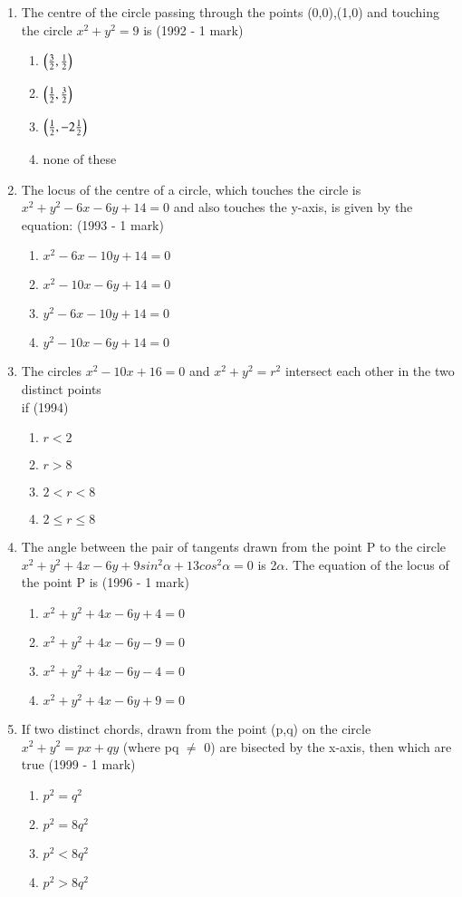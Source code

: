 \documentclass[journal,12pt,twocolumn]{IEEEtran}
\theoremstyle{remark}
\begin{document}
\begin{enumerate}[label=\arabic*.]
    \item The centre of the circle passing through the points (0,0),(1,0) and touching the circle $x^{2}+y^{2}=9$ is
    \hfill {(1992 - 1 mark)}
    \begin{enumerate}[label=(\alph*)]
    \item $\left(\frac{3}{2},\frac{1}{2}\right)$
    \item $\left(\frac{1}{2},\frac{3}{2}\right)$
    \item $\left(\frac{1}{2},-2\frac{1}{2}\right)$
    \item none of these
    \end{enumerate}
    \item The locus of the centre of a circle, which touches the circle is $x^{2}+y^{2}-6x-6y+14=0$ and also touches the y-axis, is given by the equation: \hfill {(1993 - 1 mark)}
    \begin{enumerate}[label=(\alph*)]
    \item $x^{2}-6x-10y+14=0$
    \item $x^{2}-10x-6y+14=0$
    \item $y^{2}-6x-10y+14=0$
    \item $y^{2}-10x-6y+14=0$
    \end{enumerate}
    \item The circles $x^{2}-10x+16=0$ and $x^{2}+y^{2}=r^{2}$ intersect each other in the two distinct points\\ if
    \hfill {(1994)}
    \begin{enumerate}[label=(\alph*)]
    \item $r<2$
    \item $r>8$
    \item $2<r<8$
    \item $2\leq r\leq8$
    \end{enumerate}
    \item The angle between the pair of tangents drawn from the point P to the circle $x^{2}+y^{2}+4x-6y+9sin^{2}\alpha+13cos^{2}\alpha=0$ is 2$\alpha$. The equation of the locus of the point P is
    \hfill {(1996 - 1 mark)}
    \begin{enumerate}[label=(\alph*)]
    \item $x^{2}+y^{2}+4x-6y+4=0$
    \item $x^{2}+y^{2}+4x-6y-9=0$
    \item $x^{2}+y^{2}+4x-6y-4=0$
    \item $x^{2}+y^{2}+4x-6y+9=0$
    \end{enumerate}
    \item If two distinct chords, drawn from the point (p,q) on the circle $x^{2}+y^{2}=px+qy$ (where pq $\neq$ 0) are bisected by the x-axis, then which are true
    \hfill {(1999 - 1 mark)}
    \begin{enumerate}[label=(\alph*)]
    \item $p^{2}=q^{2}$
    \item $p^{2}=8q^{2}$ 
    \item $p^{2}<8q^{2}$
    \item $p^{2}>8q^{2}$
    \end{enumerate}
    
\end{enumerate}
\end{document}
